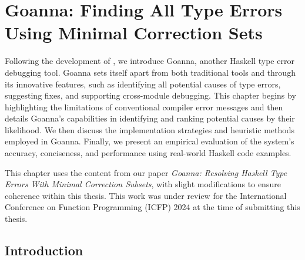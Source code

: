 
\chapter{Goanna: Finding All Type Errors Using Minimal Correction Sets} 

\label{chap:goanna} 
\graphicspath{{Figures/Goanna}}


Following the development of \chameleon{}, we introduce Goanna, another Haskell type error debugging tool. Goanna sets itself apart from both traditional tools and \chameleon{} through its innovative features, such as identifying all potential causes of type errors, suggesting fixes, and supporting cross-module debugging. This chapter begins by highlighting the limitations of conventional compiler error messages and then details Goanna's capabilities in identifying and ranking potential causes by their likelihood. We then discuss the implementation strategies and heuristic methods employed in Goanna. Finally, we present an empirical evaluation of the system's accuracy, conciseness, and performance using real-world Haskell code examples.


 This chapter uses the content from our paper \textit{Goanna: Resolving Haskell Type Errors With Minimal Correction Subsets}, with slight modifications to ensure coherence within this thesis. This work was under review for the International Conference on Function Programming (ICFP) 2024 at the time of submitting this thesis.



\section{Introduction} \label{sec:introduction}
    
